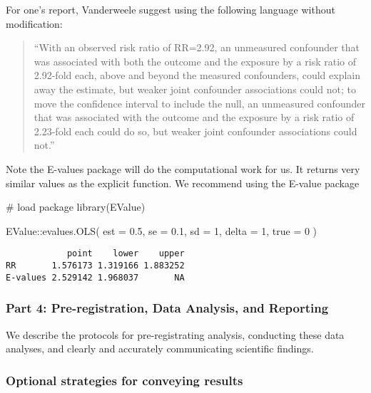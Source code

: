 \documentclass[
  singlecolumn]{article}
\newenvironment{Shaded}{\begin{snugshade}}{\end{snugshade}}
\newcommand{\AttributeTok}[1]{\textcolor[rgb]{0.40,0.45,0.13}{#1}}
\newcommand{\CommentTok}[1]{\textcolor[rgb]{0.37,0.37,0.37}{#1}}
\newcommand{\DecValTok}[1]{\textcolor[rgb]{0.68,0.00,0.00}{#1}}
\newcommand{\FloatTok}[1]{\textcolor[rgb]{0.68,0.00,0.00}{#1}}
\newcommand{\FunctionTok}[1]{\textcolor[rgb]{0.28,0.35,0.67}{#1}}
\newcommand{\NormalTok}[1]{\textcolor[rgb]{0.00,0.23,0.31}{#1}}
\newcommand{\SpecialCharTok}[1]{\textcolor[rgb]{0.37,0.37,0.37}{#1}}
\begin{document}
For one's report, Vanderweele suggest using the following language
without modification:

\begin{quote}
``With an observed risk ratio of RR=2.92, an unmeasured confounder that
was associated with both the outcome and the exposure by a risk ratio of
2.92-fold each, above and beyond the measured confounders, could explain
away the estimate, but weaker joint confounder associations could not;
to move the confidence interval to include the null, an unmeasured
confounder that was associated with the outcome and the exposure by a
risk ratio of 2.23-fold each could do so, but weaker joint confounder
associations could not.''
\end{quote}

Note the E-values package will do the computational work for us. It
returns very similar values as the explicit function. We recommend using
the E-value package

\begin{Shaded}
\begin{Highlighting}[]
\CommentTok{\# load package}
\FunctionTok{library}\NormalTok{(EValue)}

\NormalTok{EValue}\SpecialCharTok{::}\FunctionTok{evalues.OLS}\NormalTok{( }\AttributeTok{est =} \FloatTok{0.5}\NormalTok{, }\AttributeTok{se =} \FloatTok{0.1}\NormalTok{, }\AttributeTok{sd =} \DecValTok{1}\NormalTok{, }\AttributeTok{delta =} \DecValTok{1}\NormalTok{, }\AttributeTok{true =} \DecValTok{0}\NormalTok{ )}
\end{Highlighting}
\end{Shaded}

\begin{verbatim}
            point    lower    upper
RR       1.576173 1.319166 1.883252
E-values 2.529142 1.968037       NA
\end{verbatim}

\subsubsection{Part 4: Pre-registration, Data Analysis, and
Reporting}\label{part-4-pre-registration-data-analysis-and-reporting}

We describe the protocols for pre-registrating analysis, conducting
these data analyses, and clearly and accurately communicating scientific
findings.

\subsubsection{Optional strategies for conveying
results}\label{optional-strategies-for-conveying-results}
\end{document}
